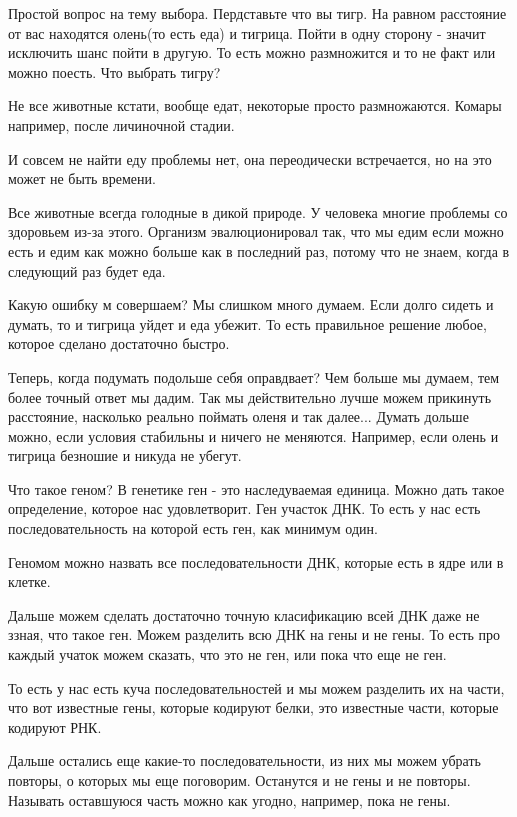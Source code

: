 ﻿Простой вопрос на тему выбора. 
Пердставьте что вы тигр. На равном расстояние от 
вас находятся олень(то есть еда) и тигрица. Пойти в одну 
сторону - значит исключить шанс пойти в другую. То есть 
можно размножится и то не факт или можно поесть. Что 
выбрать тигру? 

Не все животные кстати, вообще едат, некоторые просто размножаются. 
Комары например, после личиночной стадии. 

И совсем не найти еду проблемы нет, она переодически встречается, 
но на это может не быть времени. 

Все животные всегда голодные в дикой природе. У человека многие 
проблемы со здоровьем из-за этого. Организм эвалюционировал так, 
что мы едим если можно есть и едим как можно больше как в 
последний раз, потому что не знаем, когда в следующий раз будет еда. 

Какую ошибку м совершаем? Мы слишком много думаем. Если долго 
сидеть и думать, то и тигрица уйдет и еда убежит. То есть 
правильное решение любое, которое сделано достаточно быстро. 

Теперь, когда подумать подольше себя оправдвает? 
Чем больше мы думаем, тем более точный ответ мы дадим. 
Так мы действительно лучше можем прикинуть расстояние, 
насколько реально поймать оленя и так далее... Думать 
дольше можно, если условия стабильны и ничего не меняются. 
Например, если олень и тигрица безношие и никуда не убегут. 

Что такое геном? 
В генетике ген - это наследуваемая единица. Можно 
дать такое определение, которое нас удовлетворит. Ген 
участок ДНК. То есть у нас есть последовательность 
на которой есть ген, как минимум один. 

Геномом можно назвать все последовательности ДНК, которые есть 
в ядре или в клетке. 

Дальше можем сделать достаточно точную класификацию 
всей ДНК даже не ззная, что такое ген. Можем разделить 
всю ДНК на гены и не гены. То есть про каждый учаток можем сказать, 
что это не ген, или пока что еще не ген. 

То есть у нас есть куча последовательностей и мы можем разделить их 
на части, что вот известные гены, которые кодируют белки, 
это известные части, которые кодируют РНК. 

Дальше остались еще какие-то последовательности, из 
них мы можем убрать повторы, о которых мы еще поговорим. Останутся и 
не гены и не повторы. Называть оставшуюся часть можно как угодно, 
например, пока не гены. 

